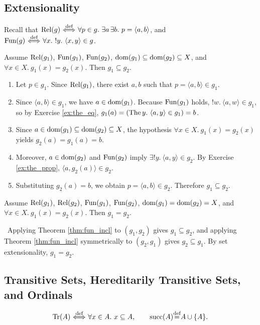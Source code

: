 \documentclass[10pt,a4paper]{article}
\begin{document}
\subsection{Extensionality}\label{sec:extensionality}
Recall that ${\textrm{Rel}}(g) {\stackrel{{\textrm{def}}}{\ \Longleftrightarrow\ }} \forall p \in g.\ \exists a\, \exists b.\ p = \langle a,b\rangle$, and ${\textrm{Fun}}(g) {\stackrel{{\textrm{def}}}{\ \Longleftrightarrow\ }} \forall x.\ !y.\ \langle x,y\rangle \in g$.

\begin{theorem}\label{thm:fun_incl}
Assume ${\textrm{Rel}}(g_1)$, ${\textrm{Fun}}(g_1)$, ${\textrm{Fun}}(g_2)$, ${\textrm{dom}}(g_1)\subseteq{\textrm{dom}}(g_2)\subseteq X$, and $\forall x\in X.\ g_1(x)=g_2(x)$. Then $g_1\subseteq g_2$.
\end{theorem}
\myprf
\begin{enumerate}
\item Let $p \in g_1$. Since ${\textrm{Rel}}(g_1)$, there exist $a, b$ such that $p = \langle a, b\rangle \in g_1$.
\item Since $\langle a, b\rangle \in g_1$, we have $a \in {\textrm{dom}}(g_1)$. Because ${\textrm{Fun}}(g_1)$ holds, $!w.\ \langle a,w\rangle \in g_1$, so by Exercise \ref{ex:the_eq}, $g_1(a) = ({\textrm{The\,}} y.\ \langle a,y\rangle \in g_1) = b$.
\item Since $a \in {\textrm{dom}}(g_1) \subseteq {\textrm{dom}}(g_2) \subseteq X$, the hypothesis $\forall x \in X.\ g_1(x) = g_2(x)$ yields $g_2(a) = g_1(a) = b$.
\item Moreover, $a \in {\textrm{dom}}(g_2)$ and ${\textrm{Fun}}(g_2)$ imply $\exists !y.\ \langle a,y\rangle \in g_2$. By Exercise \ref{ex:the_prop}, $\langle a, g_2(a)\rangle \in g_2$.
\item Substituting $g_2(a) = b$, we obtain $p = \langle a, b\rangle \in g_2$. Therefore $g_1 \subseteq g_2$.
\end{enumerate}
\myqed

\begin{theorem}\label{thm:fun_ext}
Assume ${\textrm{Rel}}(g_1)$, ${\textrm{Rel}}(g_2)$, ${\textrm{Fun}}(g_1)$, ${\textrm{Fun}}(g_2)$, ${\textrm{dom}}(g_1) = {\textrm{dom}}(g_2) = X$, and $\forall x\in X.\ g_1(x)=g_2(x)$. Then $g_1 = g_2$.
\end{theorem}
\myprf\ Applying Theorem \ref{thm:fun_incl} to $(g_1, g_2)$ gives $g_1 \subseteq g_2$, and applying Theorem \ref{thm:fun_incl} symmetrically to $(g_2, g_1)$ gives $g_2 \subseteq g_1$. By set extensionality, $g_1 = g_2$. \myqed
\subsection{Transitive Sets, Hereditarily Transitive Sets, and Ordinals}\label{sec:ordinals}
\begin{definition}
$$\Tr(A) \propdef \forall x\in A.\ x\subseteq A, \qquad \mysucc(A) \eqdef A \cup \{A\}.$$
\end{definition}
\end{document}
